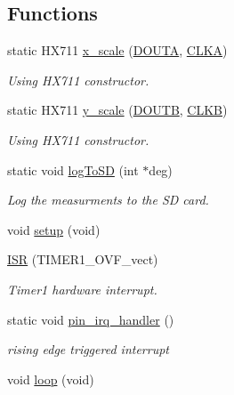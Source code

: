\subsection*{Functions}
\begin{DoxyCompactItemize}
\item 
static H\+X711 \mbox{\hyperlink{windsensor_8ino_a63487c630a07521a6eb55b8f607c193f}{x\+\_\+scale}} (\mbox{\hyperlink{windsensor_8ino_a1536230053989f05113870b57c81b368}{D\+O\+U\+TA}}, \mbox{\hyperlink{windsensor_8ino_a6a5dcd886a8a52cab810eb8a461c96f5}{C\+L\+KA}})
\begin{DoxyCompactList}\small\item\em Using H\+X711 constructor. \end{DoxyCompactList}\item 
static H\+X711 \mbox{\hyperlink{windsensor_8ino_aff383f74e82e01501521b84d1bc001e2}{y\+\_\+scale}} (\mbox{\hyperlink{windsensor_8ino_a3d0814fa8af472164fbf0843faa35d5c}{D\+O\+U\+TB}}, \mbox{\hyperlink{windsensor_8ino_aeeac7c3e17c81d104245d857c7bd184f}{C\+L\+KB}})
\begin{DoxyCompactList}\small\item\em Using H\+X711 constructor. \end{DoxyCompactList}\item 
static void \mbox{\hyperlink{windsensor_8ino_a6125069fcf9a9e592937a7b143c4ce7a}{log\+To\+SD}} (int $\ast$deg)
\begin{DoxyCompactList}\small\item\em Log the measurments to the SD card. \end{DoxyCompactList}\item 
void \mbox{\hyperlink{windsensor_8ino_a7dfd9b79bc5a37d7df40207afbc5431f}{setup}} (void)
\item 
\mbox{\hyperlink{windsensor_8ino_ab16889ae984b9b798989a0d239283cac}{I\+SR}} (T\+I\+M\+E\+R1\+\_\+\+O\+V\+F\+\_\+vect)
\begin{DoxyCompactList}\small\item\em Timer1 hardware interrupt. \end{DoxyCompactList}\item 
static void \mbox{\hyperlink{windsensor_8ino_a326020c34cf7bde02de2cafe8f9e62c1}{pin\+\_\+irq\+\_\+handler}} ()
\begin{DoxyCompactList}\small\item\em rising edge triggered interrupt \end{DoxyCompactList}\item 
void \mbox{\hyperlink{windsensor_8ino_a0b33edabd7f1c4e4a0bf32c67269be2f}{loop}} (void)
\end{DoxyCompactItemize}
